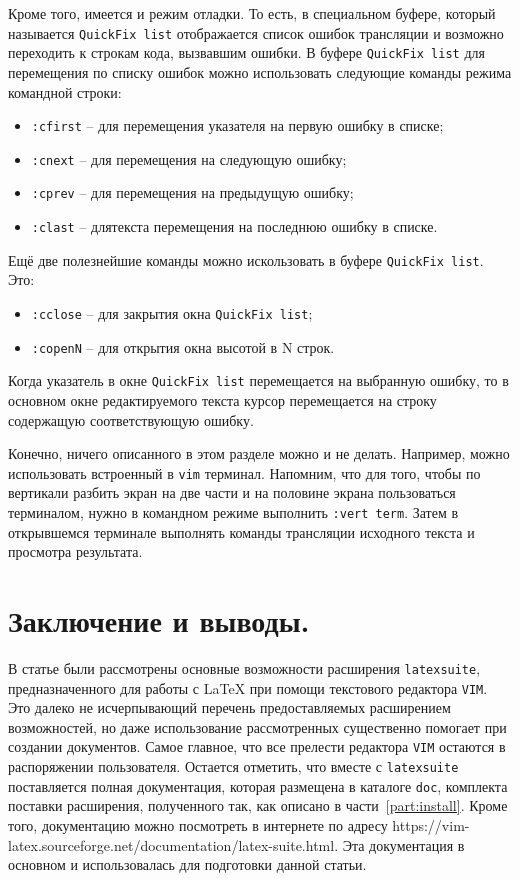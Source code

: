 \documentclass[a4paper]{article}
\begin{document}
Кроме того, имеется и режим отладки. То есть, в специальном буфере, который называется \texttt{QuickFix list}
отображается список ошибок трансляции и возможно переходить к строкам кода, вызвавшим ошибки. 
В буфере \texttt{QuickFix list} для перемещения по списку ошибок можно использовать следующие команды
режима командной строки:
\begin{itemize}
	\item \verb|:cfirst| -- для перемещения указателя на первую ошибку в списке;
	\item \verb|:cnext| -- для перемещения на следующую ошибку;
	\item \verb|:cprev| -- для перемещения на предыдущую ошибку;
	\item \verb|:clast| -- длятекста перемещения на последнюю ошибку в списке.
\end{itemize}
Ещё две полезнейшие команды можно искользовать в буфере \texttt{QuickFix list}. Это:
\begin{itemize}
	\item \verb|:cclose| -- для закрытия окна \texttt{QuickFix list};
	\item \verb|:copenN| -- для открытия окна высотой в N строк.
	\end{itemize}
Когда указатель в окне \texttt{QuickFix list} перемещается на выбранную ошибку, то в основном
окне редактируемого текста курсор перемещается на строку содержащую соответствующую ошибку.

Конечно, ничего описанного в этом разделе можно и не делать. Например, можно использовать
встроенный в \texttt{vim} терминал. Напомним, что для того, чтобы по вертикали разбить 
экран на две части и на половине экрана пользоваться терминалом, нужно в командном режиме
выполнить \texttt{:vert term}. Затем в открывшемся терминале выполнять команды трансляции
исходного текста и просмотра результата. 

\part{Заключение и выводы.}
В статье были рассмотрены основные возможности расширения \texttt{latexsuite}, 
предназначенного для работы с \LaTeX{} при помощи текстового редактора \texttt{VIM}.
Это далеко не исчерпывающий перечень предоставляемых расширением возможностей, но даже 
использование рассмотренных существенно помогает при создании документов. Самое главное, 
что все прелести редактора \texttt{VIM} остаются в распоряжении пользователя. 
Остается отметить, что вместе с \texttt{latexsuite} поставляется полная документация,
которая размещена в каталоге \texttt{doc}, комплекта поставки расширения, полученного
так, как описано в части~\ref{part:install}. Кроме того, документацию можно посмотреть 
в интернете по адресу https://vim-latex.sourceforge.net/documentation/latex-suite.html.
Эта документация в основном и использовалась для подготовки данной статьи. 
\end{document}
